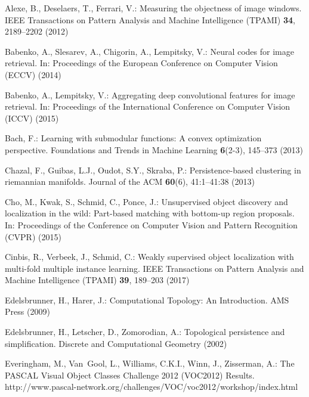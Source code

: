 \documentclass[runningheads]{llncs}
\begin{document}
\clearpage
 \ifx\URL\undefined {}
  \def\URL{\catcode`\~=12 \catcode`\_=12 \URLset} \fi
\begin{thebibliography}{10}
\providecommand{\url}[1]{\texttt{#1}}
\providecommand{\urlprefix}{URL }
\providecommand{\doi}[1]{https://doi.org/#1}

Alexe, B., Deselaers, T., Ferrari, V.: Measuring the objectness of image
  windows. {IEEE} Transactions on Pattern Analysis and Machine Intelligence
  ({TPAMI})  \textbf{34},  2189--2202 (2012)

Babenko, A., Slesarev, A., Chigorin, A., Lempitsky, V.: Neural codes for image
  retrieval. In: Proceedings of the European Conference on Computer Vision
  ({ECCV}) (2014)

Babenko, A., Lempitsky, V.: Aggregating deep convolutional features for image
  retrieval. In: Proceedings of the International Conference on Computer Vision
  ({ICCV}) (2015)

Bach, F.: Learning with submodular functions: A convex optimization
  perspective. Foundations and Trends in Machine Learning  \textbf{6}(2-3),
  145--373 (2013)

Chazal, F., Guibas, L.J., Oudot, S.Y., Skraba, P.: Persistence-based clustering
  in riemannian manifolds. Journal of the ACM  \textbf{60}(6),  41:1--41:38
  (2013)

Cho, M., Kwak, S., Schmid, C., Ponce, J.: Unsupervised object discovery and
  localization in the wild: Part-based matching with bottom-up region
  proposals. In: Proceedings of the Conference on Computer Vision and Pattern
  Recognition ({CVPR}) (2015)

Cinbis, R., Verbeek, J., Schmid, C.: Weakly supervised object localization with
  multi-fold multiple instance learning. {IEEE} Transactions on Pattern
  Analysis and Machine Intelligence ({TPAMI})  \textbf{39},  189–203 (2017)

Edelsbrunner, H., Harer, J.: {Computational Topology: An Introduction}. AMS
  Press  (2009)

Edelsbrunner, H., Letscher, D., Zomorodian, A.: Topological persistence and
  simplification. Discrete and Computational Geometry  (2002)

Everingham, M., Van~Gool, L., Williams, C.K.I., Winn, J., Zisserman, A.: The
  {PASCAL} {V}isual {O}bject {C}lasses {C}hallenge 2012 {(VOC2012)} {R}esults.
  http://www.pascal-network.org/challenges/VOC/voc2012/workshop/index.html


\end{thebibliography}
\end{document}
